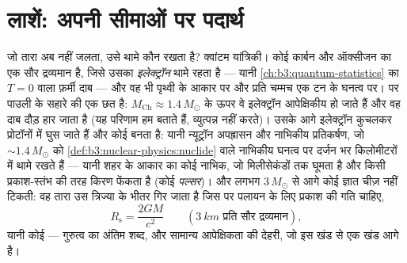 \section{लाशें: अपनी सीमाओं पर पदार्थ}

\begin{proposition}[श्वेत वामन और न्यूट्रॉन तारे]\label{prop:b3:astrophysics:compact}
जो तारा अब नहीं जलता, उसे थामे कौन रखता है? क्वांटम यांत्रिकी। कोई
\emph{} कार्बन और ऑक्सीजन का एक सौर द्रव्यमान है, जिसे उसका
\emph{इलेक्ट्रॉन } थामे रहता है --- यानी
\cref{ch:b3:quantum-statistics} का $T = 0$ वाला फ़र्मी दाब --- और वह
भी पृथ्वी के आकार पर और प्रति चम्मच एक टन के घनत्व पर। पर पाउली के
सहारे की एक छत है: \emph{} $M_{\text{Ch}}
\approx 1.4\,M_\odot$ के ऊपर वे इलेक्ट्रॉन आपेक्षिकीय हो जाते हैं और
वह दाब दौड़ हार जाता है (यह परिणाम हम बताते हैं, व्युत्पन्न नहीं
करते)। उसके आगे इलेक्ट्रॉन कुचलकर प्रोटॉनों में घुस जाते हैं और कोई
\emph{} बनता है: यानी न्यूट्रॉन अपह्रासन और नाभिकीय
प्रतिकर्षण, जो $\sim1.4\,M_\odot$ को
\cref{def:b3:nuclear-physics:nuclide} वाले नाभिकीय घनत्व पर दर्जन भर
किलोमीटरों में थामे रखते हैं --- यानी शहर के आकार का कोई नाभिक, जो
मिलीसेकंडों तक घूमता है और किसी प्रकाश-स्तंभ की तरह किरण फेंकता है
(कोई \emph{पल्सर})। और लगभग $3\,M_\odot$ से आगे कोई ज्ञात चीज़ नहीं
टिकती: वह तारा उस त्रिज्या के भीतर गिर जाता है जिस पर
पलायन के लिए प्रकाश की गति चाहिए,
\[
R_{\text{s}} = \frac{2GM}{c^2}
\qquad (\qty{3}{km}\text{ प्रति सौर द्रव्यमान}) ,
\]
यानी कोई \emph{} --- गुरुत्व का अंतिम शब्द, और सामान्य
आपेक्षिकता की देहरी, जो इस खंड से एक खंड आगे है।
\end{proposition}
\admitted

